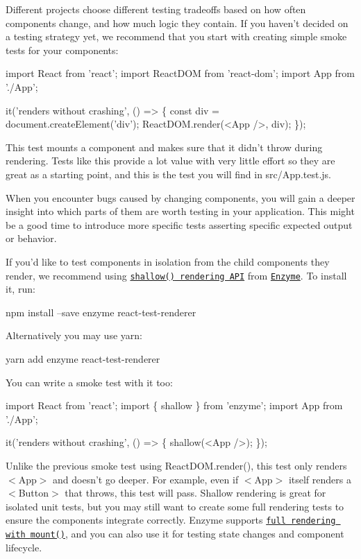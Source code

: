 Different projects choose different testing tradeoffs based on how often components change, and how much logic they contain. If you haven’t decided on a testing strategy yet, we recommend that you start with creating simple smoke tests for your components\+:


\begin{DoxyCode}
import React from 'react';
import ReactDOM from 'react-dom';
import App from './App';

it('renders without crashing', () => \{
  const div = document.createElement('div');
  ReactDOM.render(<App />, div);
\});
\end{DoxyCode}


This test mounts a component and makes sure that it didn’t throw during rendering. Tests like this provide a lot value with very little effort so they are great as a starting point, and this is the test you will find in {\ttfamily src/\+App.\+test.\+js}.

When you encounter bugs caused by changing components, you will gain a deeper insight into which parts of them are worth testing in your application. This might be a good time to introduce more specific tests asserting specific expected output or behavior.

If you’d like to test components in isolation from the child components they render, we recommend using \href{http://airbnb.io/enzyme/docs/api/shallow.html}{\tt {\ttfamily shallow()} rendering A\+PI} from \href{http://airbnb.io/enzyme/}{\tt Enzyme}. To install it, run\+:


\begin{DoxyCode}
npm install --save enzyme react-test-renderer
\end{DoxyCode}


Alternatively you may use {\ttfamily yarn}\+:


\begin{DoxyCode}
yarn add enzyme react-test-renderer
\end{DoxyCode}


You can write a smoke test with it too\+:


\begin{DoxyCode}
import React from 'react';
import \{ shallow \} from 'enzyme';
import App from './App';

it('renders without crashing', () => \{
  shallow(<App />);
\});
\end{DoxyCode}


Unlike the previous smoke test using {\ttfamily React\+D\+O\+M.\+render()}, this test only renders {\ttfamily $<$App$>$} and doesn’t go deeper. For example, even if {\ttfamily $<$App$>$} itself renders a {\ttfamily $<$Button$>$} that throws, this test will pass. Shallow rendering is great for isolated unit tests, but you may still want to create some full rendering tests to ensure the components integrate correctly. Enzyme supports \href{http://airbnb.io/enzyme/docs/api/mount.html}{\tt full rendering with {\ttfamily mount()}}, and you can also use it for testing state changes and component lifecycle.

